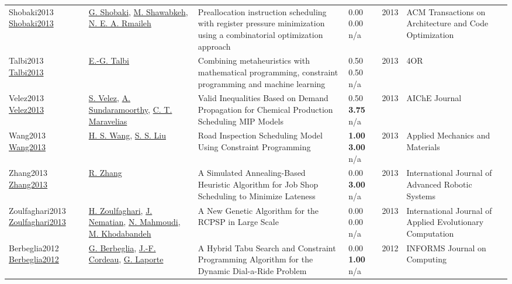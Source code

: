 {\begin{longtable}{p{3cm}p{5cm}p{10cm}p{1cm}rp{2.5cm}l}
Shobaki2013 \href{http://dx.doi.org/10.1145/2512432}{Shobaki2013} & \hyperref[auth:a1784]{G. Shobaki}, \hyperref[auth:a1785]{M. Shawabkeh}, \hyperref[auth:a1786]{N. E. A. Rmaileh} & \cellcolor{gold!20}Preallocation instruction scheduling with register pressure minimization using a combinatorial optimization approach & \noindent{}\textcolor{black!50}{0.00} \textcolor{black!50}{0.00} n/a & 2013 & ACM Transactions on Architecture and Code Optimization & \cite{Shobaki2013}\\
Talbi2013 \href{http://dx.doi.org/10.1007/s10288-013-0242-3}{Talbi2013} & \hyperref[auth:a1659]{E.-G. Talbi} & Combining metaheuristics with mathematical programming, constraint programming and machine learning & \noindent{}0.50 0.50 n/a & 2013 & 4OR & \cite{Talbi2013}\\
Velez2013 \href{http://dx.doi.org/10.1002/aic.14021}{Velez2013} & \hyperref[auth:a1480]{S. Velez}, \hyperref[auth:a1481]{A. Sundaramoorthy}, \hyperref[auth:a381]{C. T. Maravelias} & Valid Inequalities Based on Demand Propagation for Chemical Production Scheduling MIP Models & \noindent{}0.50 \textbf{3.75} n/a & 2013 & AIChE Journal & \cite{Velez2013}\\
Wang2013 \href{http://dx.doi.org/10.4028/www.scientific.net/amm.357-360.2720}{Wang2013} & \hyperref[auth:a1903]{H. S. Wang}, \hyperref[auth:a1904]{S. S. Liu} & Road Inspection Scheduling Model Using Constraint Programming & \noindent{}\textbf{1.00} \textbf{3.00} n/a & 2013 & Applied Mechanics and Materials & \cite{Wang2013}\\
Zhang2013 \href{http://dx.doi.org/10.5772/55956}{Zhang2013} & \hyperref[auth:a1517]{R. Zhang} & \cellcolor{gold!20}A Simulated Annealing-Based Heuristic Algorithm for Job Shop Scheduling to Minimize Lateness & \noindent{}\textcolor{black!50}{0.00} \textbf{3.00} n/a & 2013 & International Journal of Advanced Robotic Systems & \cite{Zhang2013}\\
Zoulfaghari2013 \href{http://dx.doi.org/10.4018/jaec.2013040103}{Zoulfaghari2013} & \hyperref[auth:a1758]{H. Zoulfaghari}, \hyperref[auth:a1759]{J. Nematian}, \hyperref[auth:a1760]{N. Mahmoudi}, \hyperref[auth:a1761]{M. Khodabandeh} & A New Genetic Algorithm for the RCPSP in Large Scale & \noindent{}\textcolor{black!50}{0.00} \textcolor{black!50}{0.00} n/a & 2013 & International Journal of Applied Evolutionary Computation & \cite{Zoulfaghari2013}\\
Berbeglia2012 \href{http://dx.doi.org/10.1287/ijoc.1110.0454}{Berbeglia2012} & \hyperref[auth:a1847]{G. Berbeglia}, \hyperref[auth:a1848]{J.-F. Cordeau}, \hyperref[auth:a1074]{G. Laporte} & A Hybrid Tabu Search and Constraint Programming Algorithm for the Dynamic Dial-a-Ride Problem & \noindent{}\textcolor{black!50}{0.00} \textbf{1.00} n/a & 2012 & \cellcolor{red!20}INFORMS Journal on Computing & \cite{Berbeglia2012}\\

\end{longtable}}
